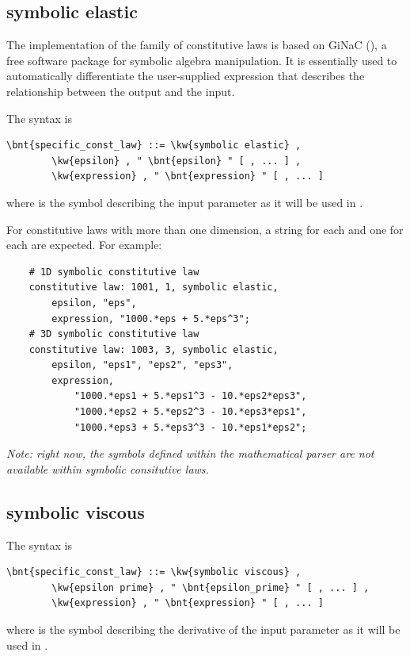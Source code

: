 \subsection{symbolic elastic}\label{sec:CL:SYMBOLIC-ELASTIC}
The implementation  of the family of  constitutive laws
is based on GiNaC 
(),
a free software package for symbolic algebra manipulation.
It is essentially used to automatically differentiate
the user-supplied expression that describes the relationship
between the output and the input.

The syntax is
\begin{Verbatim}[commandchars=\\\{\}]
    \bnt{specific_const_law} ::= \kw{symbolic elastic} ,
        \kw{epsilon} , " \bnt{epsilon} " [ , ... ] ,
        \kw{expression} , " \bnt{expression} " [ , ... ]
\end{Verbatim}
where  is the symbol describing the input
parameter as it will be used in .

For constitutive laws with more than one dimension,
a string for each  and one for each 
are expected.  For example:
\begin{verbatim}
    # 1D symbolic constitutive law
    constitutive law: 1001, 1, symbolic elastic,
        epsilon, "eps",
        expression, "1000.*eps + 5.*eps^3";
    # 3D symbolic constitutive law
    constitutive law: 1003, 3, symbolic elastic,
        epsilon, "eps1", "eps2", "eps3",
        expression,
            "1000.*eps1 + 5.*eps1^3 - 10.*eps2*eps3",
            "1000.*eps2 + 5.*eps2^3 - 10.*eps3*eps1",
            "1000.*eps3 + 5.*eps3^3 - 10.*eps1*eps2";
\end{verbatim}

\emph{Note: right now, the symbols defined within the mathematical parser
are not available within symbolic consitutive laws.}

\subsection{symbolic viscous}\label{sec:CL:SYMBOLIC-VISCOUS}
The syntax is
\begin{Verbatim}[commandchars=\\\{\}]
    \bnt{specific_const_law} ::= \kw{symbolic viscous} ,
        \kw{epsilon prime} , " \bnt{epsilon_prime} " [ , ... ] ,
        \kw{expression} , " \bnt{expression} " [ , ... ]
\end{Verbatim}
where  is the symbol describing the derivative
of the input parameter as it will be used in .

